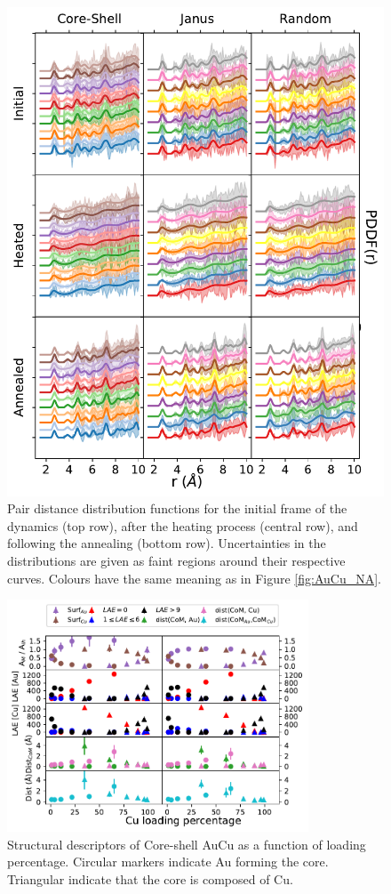 \begin{figure}
    \centering
    \includegraphics{figures/MD/Alloys/Melt_Au-Cu.pdf}
    \caption{Pair distance distribution functions for the initial frame of the dynamics (top row), after the heating process (central row), and following the annealing (bottom row). Uncertainties in the distributions are given as faint regions around their respective curves. Colours have the same meaning as in Figure \ref{fig:AuCu_NA}. }
    \label{fig:AuCu_PDF}
\end{figure}

\begin{figure}
    \centering
    \includegraphics[width=0.8\textwidth]{figures/MD/Alloys/Core-Shell_Au-Cu.pdf}
    \caption{Structural descriptors of Core-shell AuCu as a function of loading percentage. Circular markers indicate Au forming the core. Triangular indicate that the core is composed of Cu.}
    \label{fig:AuCuCS_Dyn}
\end{figure}


